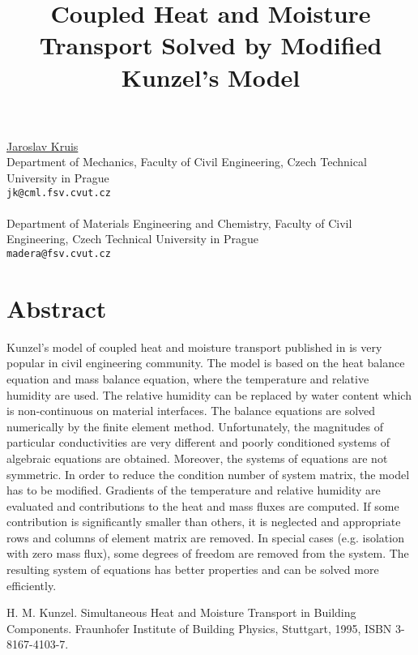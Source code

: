 \title{Coupled Heat and Moisture Transport Solved by Modified Kunzel's Model}
 \author{} \institute{}
\maketitle
\begin{center}
{\large \underline{Jaroslav Kruis}}\\
Department of Mechanics, Faculty of Civil Engineering, Czech Technical University in Prague\\
{\tt jk@cml.fsv.cvut.cz}
\\ \\
Department of Materials Engineering and Chemistry, Faculty of Civil Engineering, Czech Technical University in Prague\\
{\tt madera@fsv.cvut.cz}

\end{center}

\section*{Abstract}

Kunzel's model of coupled heat and moisture transport published in \cite{Kunzel} is very popular in civil engineering community. The model is based on the heat balance equation and mass balance equation, where the temperature and relative humidity are used. The relative humidity can be replaced by water content which is non-continuous on material interfaces. The balance equations are solved numerically by the finite element method. Unfortunately, the magnitudes of particular conductivities are very different and poorly conditioned systems of algebraic equations are obtained. Moreover, the systems of equations are not symmetric. In order to reduce the condition number of system matrix, the model has to be modified. Gradients of the temperature and relative humidity are evaluated and contributions to the heat and mass fluxes are computed. If some contribution is significantly smaller than others, it is neglected and appropriate rows and columns of element matrix are removed. In special cases (e.g. isolation with zero mass flux), some degrees of freedom are removed from the system. The resulting system of equations has better properties and can be solved more efficiently.


\begin{thebibliography}{10}

{\sc H. M. Kunzel}. {Simultaneous Heat and Moisture Transport in Building Components}. Fraunhofer Institute of Building Physics, Stuttgart, 1995, ISBN 3-8167-4103-7.

\end{thebibliography}
